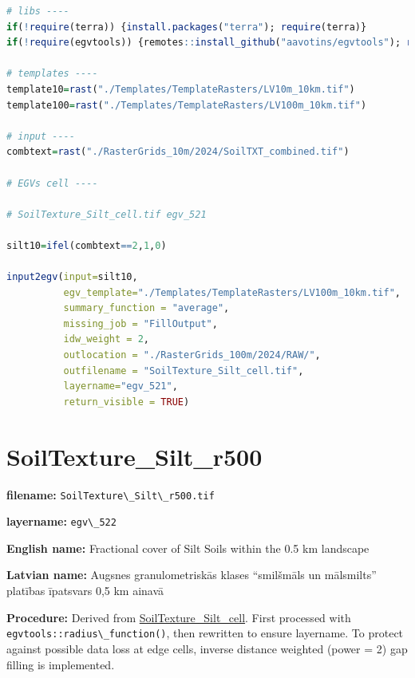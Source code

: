 \documentclass[
]{book}
\newcommand{\passthrough}[1]{#1}
\begin{document}
\begin{lstlisting}[language=R]
# libs ----
if(!require(terra)) {install.packages("terra"); require(terra)}
if(!require(egvtools)) {remotes::install_github("aavotins/egvtools"); require(egvtools)}

# templates ----
template10=rast("./Templates/TemplateRasters/LV10m_10km.tif")
template100=rast("./Templates/TemplateRasters/LV100m_10km.tif")

# input ----
combtext=rast("./RasterGrids_10m/2024/SoilTXT_combined.tif")

# EGVs cell ----

# SoilTexture_Silt_cell.tif egv_521

silt10=ifel(combtext==2,1,0)

input2egv(input=silt10,
          egv_template="./Templates/TemplateRasters/LV100m_10km.tif",
          summary_function = "average",
          missing_job = "FillOutput",
          idw_weight = 2,
          outlocation = "./RasterGrids_100m/2024/RAW/",
          outfilename = "SoilTexture_Silt_cell.tif",
          layername="egv_521",
          return_visible = TRUE)
\end{lstlisting}

\section{SoilTexture\_Silt\_r500}\label{ch06.522}

\textbf{filename:} \passthrough{\lstinline!SoilTexture\_Silt\_r500.tif!}

\textbf{layername:} \passthrough{\lstinline!egv\_522!}

\textbf{English name:} Fractional cover of Silt Soils within the 0.5 km landscape

\textbf{Latvian name:} Augsnes granulometriskās klases ``smilšmāls un mālsmilts'' platības īpatsvars 0,5 km ainavā

\textbf{Procedure:} Derived from \hyperref[ch06.521]{SoilTexture\_Silt\_cell}. First processed
with \passthrough{\lstinline!egvtools::radius\_function()!}, then rewritten to ensure layername. To protect against
possible data loss at edge cells, inverse distance weighted (power = 2) gap filling
is implemented.
\end{document}
